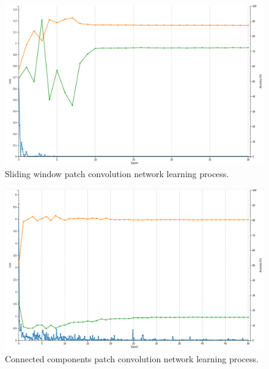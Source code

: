 \documentclass[conference,a4paper,twocolumn]{IEEEtran}
\begin{document}
\begin{figure}[!ht]
\centering
\includegraphics[scale=0.2]{figures/alexnet_loss.png}
\caption{Sliding window patch convolution network learning process.}
\label{fig01}
\end{figure}

\begin{figure}[!ht]
\centering
\includegraphics[scale=0.2]{figures/googlenet_loss.png}
\caption{Connected components patch convolution network learning process.}
\label{fig01}
\end{figure}
\end{document}
